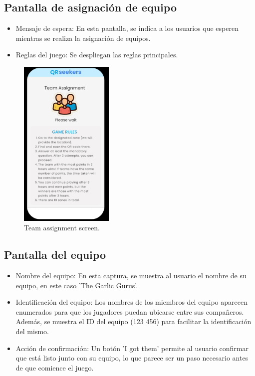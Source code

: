 \documentclass[letterpaper, 12pt]{report}
\begin{document}
\subsection{Pantalla de asignación de equipo}

\begin{itemize}
    \item Mensaje de espera: En esta pantalla, se indica a los usuarios que esperen mientras se realiza la asignación de equipos.
    \item Reglas del juego: Se despliegan las reglas principales.
\end{itemize}

\begin{figure}[H]
\centering
\includegraphics[width=0.4\textwidth]{figure5.png}
\caption{Team assignment screen.}
\label{fig:1}
\end{figure}

\subsection{Pantalla del equipo}

\begin{itemize}
    \item Nombre del equipo: En esta captura, se muestra al usuario el nombre de su equipo, en este caso 'The Garlic Gurus'.
    \item Identificación del equipo: Los nombres de los miembros del equipo aparecen enumerados para que los jugadores puedan ubicarse entre sus compañeros. Además, se muestra el ID del equipo (123 456) para facilitar la identificación del mismo.
    \item Acción de confirmación: Un botón 'I got them' permite al usuario confirmar que está listo junto con su equipo, lo que parece ser un paso necesario antes de que comience el juego.
\end{itemize}
\end{document}
